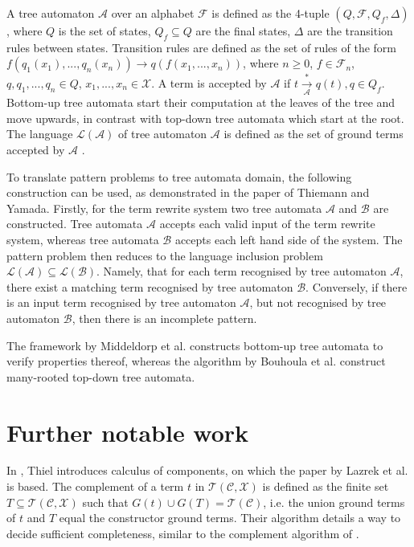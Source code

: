 A tree automaton $\mathcal{A}$ over an alphabet $\mathcal{F}$ is defined as the 4-tuple $(Q,\mathcal{F},Q_f,\Delta)$, where $Q$ is the set of states, $Q_f \subseteq Q$ are the final states, $\Delta$ are the transition rules between states. Transition rules are defined as the set of rules of the form $f(q_1(x_1), ..., q_n(x_n)) \rightarrow q(f(x_1, ..., x_n))$, where $n \geq 0$, $f \in \mathcal{F}_n$, $q, q_1, ..., q_n \in Q$, $x_1, ..., x_n \in \mathcal{X}$. A term is accepted by $\mathcal{A}$ if $t \xrightarrow[\mathcal{A}]{*} q(t), q \in Q_f$. Bottom-up tree automata start their computation at the leaves of the tree and move upwards, in contrast with top-down tree automata which start at the root. The language $\mathcal{L}(\mathcal{A})$ of tree automaton $\mathcal{A}$ is defined as the set of ground terms accepted by $\mathcal{A}$ \cite{tata}.

To translate pattern problems to tree automata domain, the following construction can be used, as demonstrated in the paper of Thiemann and Yamada\cite{thiemann}. Firstly, for the term rewrite system two tree automata $\mathcal{A}$ and $\mathcal{B}$ are constructed. Tree automata $\mathcal{A}$ accepts each valid input of the term rewrite system, whereas tree automata $\mathcal{B}$ accepts each left hand side of the system. The pattern problem then reduces to the language inclusion problem $\mathcal{L}(\mathcal{A}) \subseteq \mathcal{L}(\mathcal{B})$. Namely, that for each term recognised by tree automaton $\mathcal{A}$, there exist a matching term recognised by tree automaton $\mathcal{B}$. Conversely, if there is an input term recognised by tree automaton $\mathcal{A}$, but not recognised by tree automaton $\mathcal{B}$, then there is an incomplete pattern.

The framework by Middeldorp et al. \cite{middeldorp} constructs bottom-up tree automata to verify properties thereof, whereas the algorithm by Bouhoula et al. \cite{bouhoula} construct many-rooted top-down tree automata.

\section{Further notable work} \label{notable-work}
In \cite{thiel}, Thiel introduces calculus of components, on which the paper by Lazrek et al. is based. The complement of a term $t$ in $\mathcal{T}(\mathcal{C}, \mathcal{X})$ is defined as the finite set $T \subseteq \mathcal{T}(\mathcal{C}, \mathcal{X})$ such that $G(t) \cup G(T) = \mathcal{T}(\mathcal{C})$, i.e. the union ground terms of $t$ and $T$ equal the constructor ground terms. Their algorithm details a way to decide sufficient completeness, similar to the complement algorithm of \cite{lazrek}.

